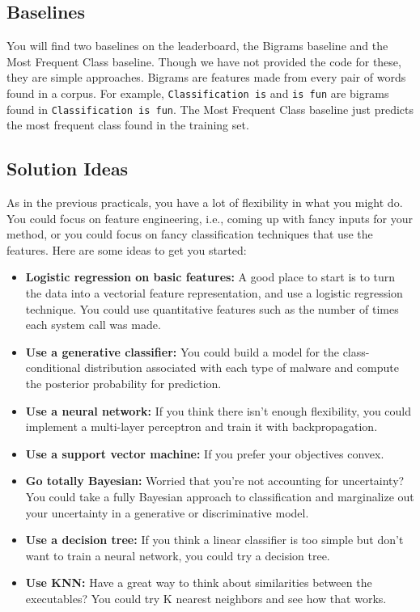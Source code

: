 \documentclass[12pt]{article}
\begin{document}
\subsection*{Baselines}
You will find two baselines on the leaderboard, the Bigrams baseline and the Most Frequent Class baseline. 
Though we have not provided the code for these, they are simple approaches.
Bigrams are features made from every pair of words found in a corpus.
For example, \texttt{Classification is} and \texttt{is fun} are bigrams found in \texttt{Classification is fun}.
The Most Frequent Class baseline just predicts the most frequent class found in the training set.

\subsection*{Solution Ideas}  As in the previous practicals, you have a lot of flexibility in what you might do.  You could focus on feature engineering, i.e., coming up with fancy inputs for your method, or you could focus on fancy classification techniques that use the features.  Here are some ideas to get you started:
\begin{itemize}

    \item \textbf{Logistic regression on basic features:} A good place to start is to turn the data into a vectorial feature representation, and use a logistic regression technique.  You could use quantitative features such as the number of times each system call was made.
        
    \item \textbf{Use a generative classifier:} You could build a model for the class-conditional distribution associated with each type of malware and compute the posterior probability for prediction.
    
    \item \textbf{Use a neural network:} If you think there isn't enough flexibility, you could implement a multi-layer perceptron and train it with backpropagation.
    
    \item \textbf{Use a support vector machine:} If you prefer your objectives convex.
    
    \item \textbf{Go totally Bayesian:} Worried that you're not accounting for uncertainty?  You could take a fully Bayesian approach to classification and marginalize out your uncertainty in a generative or discriminative model.
    
    \item \textbf{Use a decision tree:} If you think a linear classifier is too simple but don't want to train a neural network, you could try a decision tree.
    
    \item \textbf{Use KNN:} Have a great way to think about similarities between the executables?  You could try K nearest neighbors and see how that works.
    
\end{itemize}
\end{document}

